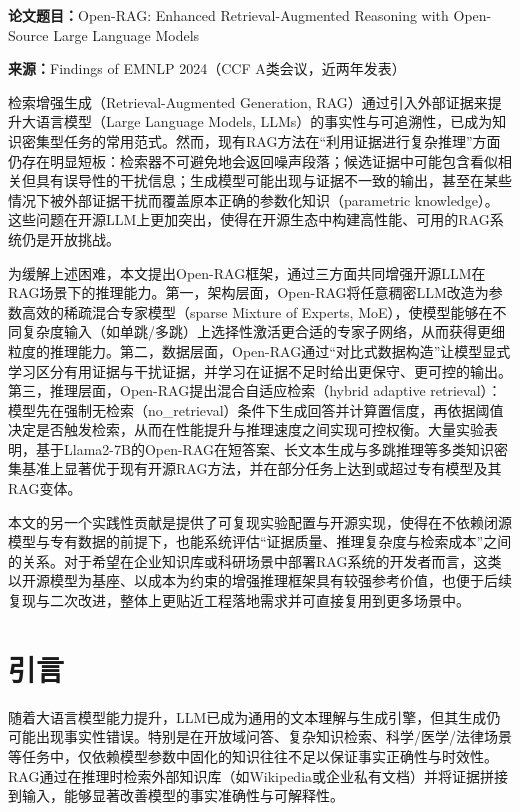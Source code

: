 \noindent\textbf{论文题目：}Open-RAG: Enhanced Retrieval-Augmented Reasoning with Open-Source Large Language Models
 
\noindent\textbf{来源：}Findings of EMNLP 2024（CCF A类会议，近两年发表）
 
检索增强生成（Retrieval-Augmented Generation, RAG）通过引入外部证据来提升大语言模型（Large Language Models, LLMs）的事实性与可追溯性，已成为知识密集型任务的常用范式。然而，现有RAG方法在“利用证据进行复杂推理”方面仍存在明显短板：检索器不可避免地会返回噪声段落；候选证据中可能包含看似相关但具有误导性的干扰信息；生成模型可能出现与证据不一致的输出，甚至在某些情况下被外部证据干扰而覆盖原本正确的参数化知识（parametric knowledge）。这些问题在开源LLM上更加突出，使得在开源生态中构建高性能、可用的RAG系统仍是开放挑战。
 
为缓解上述困难，本文提出Open-RAG框架，通过三方面共同增强开源LLM在RAG场景下的推理能力。第一，架构层面，Open-RAG将任意稠密LLM改造为参数高效的稀疏混合专家模型（sparse Mixture of Experts, MoE），使模型能够在不同复杂度输入（如单跳/多跳）上选择性激活更合适的专家子网络，从而获得更细粒度的推理能力。第二，数据层面，Open-RAG通过“对比式数据构造”让模型显式学习区分有用证据与干扰证据，并学习在证据不足时给出更保守、更可控的输出。第三，推理层面，Open-RAG提出混合自适应检索（hybrid adaptive retrieval）：模型先在强制无检索（no\_retrieval）条件下生成回答并计算置信度，再依据阈值决定是否触发检索，从而在性能提升与推理速度之间实现可控权衡。大量实验表明，基于Llama2-7B的Open-RAG在短答案、长文本生成与多跳推理等多类知识密集基准上显著优于现有开源RAG方法，并在部分任务上达到或超过专有模型及其RAG变体。

本文的另一个实践性贡献是提供了可复现实验配置与开源实现，使得在不依赖闭源模型与专有数据的前提下，也能系统评估“证据质量、推理复杂度与检索成本”之间的关系。对于希望在企业知识库或科研场景中部署RAG系统的开发者而言，这类以开源模型为基座、以成本为约束的增强推理框架具有较强参考价值，也便于后续复现与二次改进，整体上更贴近工程落地需求并可直接复用到更多场景中。
 
\section{引言}
随着大语言模型能力提升，LLM已成为通用的文本理解与生成引擎，但其生成仍可能出现事实性错误。特别是在开放域问答、复杂知识检索、科学/医学/法律场景等任务中，仅依赖模型参数中固化的知识往往不足以保证事实正确性与时效性。RAG通过在推理时检索外部知识库（如Wikipedia或企业私有文档）并将证据拼接到输入，能够显著改善模型的事实准确性与可解释性。
 
